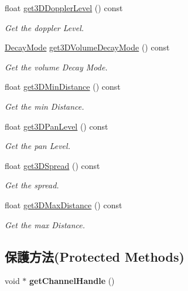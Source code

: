 \begin{DoxyCompactItemize}
float \hyperlink{class_magnum_1_1_audio_source_base_a41b350acdf0d86b4770e2ad82d38c940}{get3\+D\+Doppler\+Level} () const 
\begin{DoxyCompactList}\small\item\em Get the doppler Level. \end{DoxyCompactList}\item 
\hyperlink{class_magnum_1_1_audio_source_base_ab34de5e5b3170a8f0fce85ac723577c9}{Decay\+Mode} \hyperlink{class_magnum_1_1_audio_source_base_af391e91a553bed39946da51541652b57}{get3\+D\+Volume\+Decay\+Mode} () const 
\begin{DoxyCompactList}\small\item\em Get the volume Decay Mode. \end{DoxyCompactList}\item 
float \hyperlink{class_magnum_1_1_audio_source_base_a873f65d66feee4c6a815f55ebbc7b7c9}{get3\+D\+Min\+Distance} () const 
\begin{DoxyCompactList}\small\item\em Get the min Distance. \end{DoxyCompactList}\item 
float \hyperlink{class_magnum_1_1_audio_source_base_a5b1fadd8c7e23e796e048d18a689e0ec}{get3\+D\+Pan\+Level} () const 
\begin{DoxyCompactList}\small\item\em Get the pan Level. \end{DoxyCompactList}\item 
float \hyperlink{class_magnum_1_1_audio_source_base_a63a43e00bad4fcc571fc76d59c9b337a}{get3\+D\+Spread} () const 
\begin{DoxyCompactList}\small\item\em Get the spread. \end{DoxyCompactList}\item 
float \hyperlink{class_magnum_1_1_audio_source_base_aa6d27b8b1ba879ba722719b1c6ea5eca}{get3\+D\+Max\+Distance} () const 
\begin{DoxyCompactList}\small\item\em Get the max Distance. \end{DoxyCompactList}\end{DoxyCompactItemize}
\subsection*{保護方法(Protected Methods)}
\begin{DoxyCompactItemize}
\item 
void $\ast$ {\bfseries get\+Channel\+Handle} ()\hypertarget{class_magnum_1_1_audio_source_base_a4354d0b3dbd51c1e934bbae6f5d1fecd}{}\label{class_magnum_1_1_audio_source_base_a4354d0b3dbd51c1e934bbae6f5d1fecd}

\end{DoxyCompactItemize}
